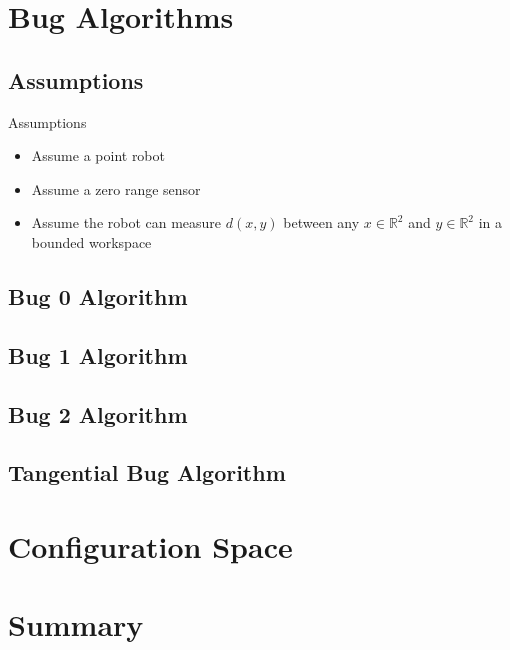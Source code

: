 \documentclass{beamer}
\begin{document}
\section[Bug Algorithms]{Bug Algorithms}

\subsection[Assumptions]{Assumptions}

\begin{frame}{Assumptions}
  \begin{itemize}
    \item Assume a point robot
    \item Assume a zero range sensor
    \item Assume the robot can measure $d(x,y)$ between any $x \in \mathbb{R}^{2} $ and $y \in \mathbb{R}^{2}$ in a bounded workspace
  \end{itemize}
\end{frame}

\subsection[Bug 0]{Bug 0 Algorithm}

\subsection[Bug 1]{Bug 1 Algorithm}

\subsection[Bug 2]{Bug 2 Algorithm}

\subsection[Tangential Bug]{Tangential Bug Algorithm}

\section[Configuration Space]{Configuration Space}

\section*{Summary}
\end{document}
